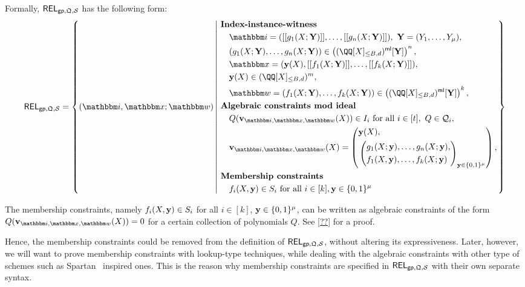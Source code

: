 \documentclass[11pt,letterpaper,usenames,dvipsnames]{article}
\begin{document}
%
  Formally, $\mathsf{REL}_{\mathsf{gp},\mathfrak{Q}, \mathcal{S}}$ has the following form:
  \begin{equation*}
  \begin{aligned}
  \REL_{\gparams,\megaQ,\cS} = \left\{ (\idx, \inp ; \wit) \left| \ \begin{aligned}
  &\textbf{Index-instance-witness}\\
  &\quad \idx = ( \oracle{g_1(X;\YY)},\ldots, \oracle{g_n(X;\YY)}), \ \YY=(Y_1,\ldots, Y_\mu), \\
          &\quad(g_1(X;\YY),\dots,g_n(X;\YY))\in \left(\mainQpolyringmultilin[\YY]\right)^{n},\\
  &\quad \inp =(\yy(X), \oracle{f_1(X;\YY)}, \ldots, \oracle{f_k(X;\YY)}),\\ &\quad \yy(X)\in \mainQpolyring^{m},\\    
      &\quad \wit = (f_1(X;\YY), \ldots, f_k(X;\YY)) \in \left(\mainQpolyringmultilin[\YY]\right)^{k},\\
      &\textbf{Algebraic constraints mod ideal}\\
      &\quad Q(\vv_{\idx, \inp,\wit}(X)) \in I_i  \text{ for all } i\in [t], \ Q\in \cQ_i,\\
      &\quad \vv_{\idx, \inp,\wit}(X) = \left(\begin{aligned}&\yy(X),\\ &\left(\begin{aligned}&g_1(X;\yy),\ldots, g_n(X;\yy),\\ &f_1(X,\yy),\ldots, f_k(X;\yy)\end{aligned}\right)_{\yy\in \BB^\mu}\\
    \end{aligned}\right),\\
    &\textbf{Membership constraints}\\
      &\quad f_i(X,\yy)\in S_i \text{ for all } i\in [k], \yy\in \{0,1\}^\mu
  \end{aligned} \right.\right\}
  \end{aligned}
  \end{equation*}

  \begin{remark}
  The membership constraints, namely $f_i(X,\mathbf{y}) \in S_i$ for all $i\in [k]$, $\mathbf{y}\in \{0,1\}^\mu$, can be written as algebraic constraints of the form $Q(\vv_{\idx,\inp,\wit}(X))=0$ for a certain collection of polynomials $Q$. See \cref{??} for a proof. 
  
  Hence, the membership constraints could be removed from the definition of $\mathsf{REL}_{\mathsf{gp}, \mathfrak{Q}, \mathcal{S}}$,  without altering its expressiveness. Later, however, we will want to prove membership constraints with lookup-type techniques, while dealing with the algebraic constraints with other type of schemes such as Spartan~\cite{C:Setty20} inspired ones. This is the reason why membership constraints are specified in $\mathsf{REL}_{\mathsf{gp},\mathfrak{Q}, \mathcal{S}}$ with their own separate syntax.
  \end{remark}
\end{document}
